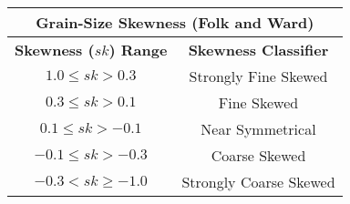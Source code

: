 \documentclass[10pt]{article}
\begin{document}
\begin{center}
\begin{tabular}{ c c  }
\multicolumn{2}{c}{\textbf{Grain-Size Skewness (Folk and Ward) }} \\
\hline
\textbf{Skewness ($sk$) Range} & \textbf{Skewness Classifier}  \\
\hline
$1.0 \le sk > 0.3 $               &  Strongly Fine Skewed   \\ 
$0.3 \le sk > 0.1 $    &  Fine Skewed   \\  
$0.1 \le sk > -0.1 $   &  Near Symmetrical  \\     
$-0.1 \le sk > -0.3 $    & Coarse Skewed    \\   
$-0.3 < sk \ge -1.0 $    & Strongly Coarse Skewed   \\
\end{tabular}
\end{center}
\end{document}

